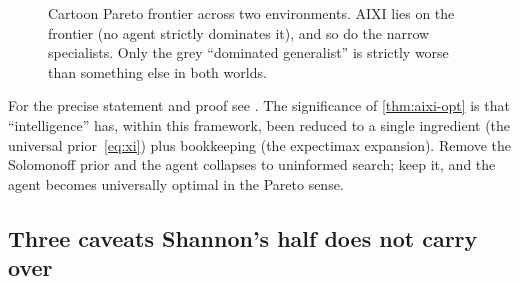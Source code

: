 \documentclass[12pt,a4paper]{article}
\theoremstyle{plain}
\theoremstyle{definition}
\begin{document}
\begin{figure}[h]
\centering
{}
\caption{Cartoon Pareto frontier across two environments.  AIXI lies
on the frontier (no agent strictly dominates it), and so do the narrow
specialists.  Only the grey ``dominated generalist'' is strictly
worse than something else in both worlds.}
\label{fig:pareto}
\end{figure}

For the precise statement and proof see
\citet[Ch.~5]{hutter2005universal}.  The significance of
\cref{thm:aixi-opt} is that ``intelligence'' has, within this
framework, been reduced to a single ingredient (the universal
prior~\eqref{eq:xi}) plus bookkeeping (the expectimax expansion).
Remove the Solomonoff prior and the agent collapses to uninformed
search; keep it, and the agent becomes universally optimal in the
Pareto sense.

\subsection*{Three caveats Shannon's half does not carry over}
\end{document}
